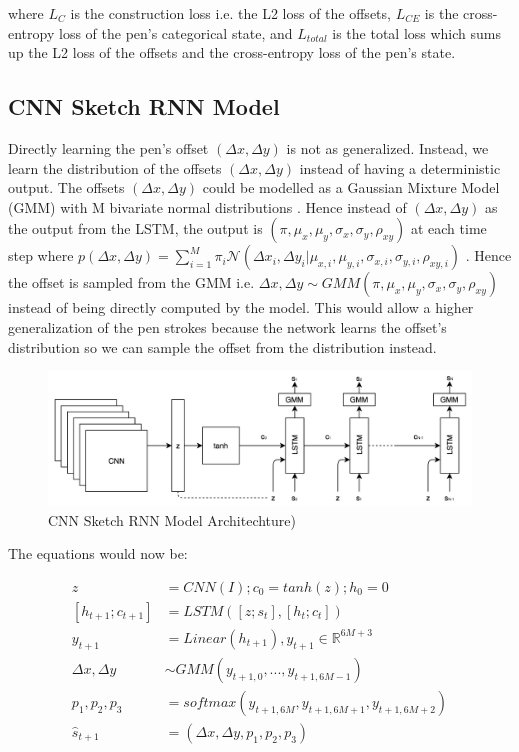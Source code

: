 \documentclass{article}
\begin{document}
where $L_{C}$ is the construction loss i.e. the L2 loss of the offsets, $L_{CE}$ is the cross-entropy loss of the pen's categorical state, and $L_{total}$ is the total loss which sums up the L2 loss of the offsets and the cross-entropy loss of the pen's state.


\subsection{CNN Sketch RNN Model}
Directly learning the pen's offset $(\Delta x, \Delta y)$ is not as generalized. Instead, we learn the distribution of the offsets $(\Delta x, \Delta y)$ instead of having a deterministic output. The offsets $(\Delta x, \Delta y)$ could be modelled as a Gaussian Mixture Model (GMM) with M bivariate normal distributions \cite{DBLP:journals/corr/Graves13}. Hence instead of $(\Delta x, \Delta y)$ as the output from the LSTM, the output is $(\pi, \mu_{x}, \mu_{y}, \sigma_{x}, \sigma_{y}, \rho_{xy})$ at each time step where $p(\Delta x, \Delta y) = \sum_{i=1}^{M} \pi_{i} \mathcal{N}(\Delta x_{i}, \Delta y_{i} | \mu_{x, i}, \mu_{y, i}, \sigma_{x, i}, \sigma_{y, i}, \rho_{xy, i})$ \cite{DBLP:journals/corr/Graves13}. Hence the offset is sampled from the GMM i.e. $\Delta x, \Delta y \sim GMM(\pi, \mu_{x}, \mu_{y}, \sigma_{x}, \sigma_{y}, \rho_{xy})$ instead of being directly computed by the model. This would allow a higher generalization of the pen strokes because the network learns the offset's distribution so we can sample the offset from the distribution instead.

\begin{figure}[h]
\centering
\includegraphics[width=12cm]{images/final_model.png}

\caption{CNN Sketch RNN Model Architechture)}
\end{figure}

The equations would now be:

\begin{align*}
z &= CNN(I); c_{0} = tanh(z); h_{0} = 0\\
[h_{t+1}; c_{t+1}] &= LSTM([z; s_{t}], [h_{t}; c_{t}])\\
y_{t+1} &= Linear(h_{t+1}), y_{t+1}\in\mathbb{R}^{6M+3}\\
\Delta x, \Delta y &\sim GMM(y_{t+1, 0}, ..., y_{t+1, 6M-1})\\
p_{1}, p_{2}, p_{3} &= softmax(y_{t+1, 6M}, y_{t+1, 6M+1}, y_{t+1, 6M+2})\\
\hat{s}_{t+1} &= (\Delta x, \Delta y, p_{1}, p_{2}, p_{3})
\end{align*}
\end{document}
